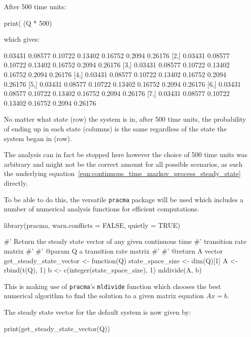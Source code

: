 After 500 time units:

\begin{Rin}
print( (Q * 500) %
\end{Rin}

which gives:

\begin{Rout}
        [,1]    [,2]    [,3]    [,4]    [,5]   [,6]    [,7]
[1,] 0.03431 0.08577 0.10722 0.13402 0.16752 0.2094 0.26176
[2,] 0.03431 0.08577 0.10722 0.13402 0.16752 0.2094 0.26176
[3,] 0.03431 0.08577 0.10722 0.13402 0.16752 0.2094 0.26176
[4,] 0.03431 0.08577 0.10722 0.13402 0.16752 0.2094 0.26176
[5,] 0.03431 0.08577 0.10722 0.13402 0.16752 0.2094 0.26176
[6,] 0.03431 0.08577 0.10722 0.13402 0.16752 0.2094 0.26176
[7,] 0.03431 0.08577 0.10722 0.13402 0.16752 0.2094 0.26176
\end{Rout}

No matter what state (row) the system is in,
after 500 time units, the probability of ending up in each state (columns) is
the same regardless of the state the system began in (row).

The analysis can in fact be stopped here
however the choice of 500 time units was arbitrary and might not be the correct
amount for all possible scenarios, as such the
underlying equation~\ref{eqn:continuous_time_markov_process_steady_state}
directly.

To be able to do this, the versatile \texttt{pracma} package will be used
which includes a number of numerical analysis functions for efficient
computations.

\begin{Rin}
library(pracma, warn.conflicts = FALSE, quietly = TRUE)

#' Return the steady state vector of any given continuous time
#' transition rate matrix
#'
#' @param Q a transition rate matrix
#'
#' @return A vector
get_steady_state_vector <- function(Q){
  state_space_size <- dim(Q)[1]
  A <- rbind(t(Q), 1)
  b <- c(integer(state_space_size), 1)
  mldivide(A, b)
}
\end{Rin}

This is making use of \texttt{pracma}'s \texttt{mldivide} function
which chooses the best numerical algorithm to find the solution to a given
matrix equation \(Ax=b\).

The steady state vector for the default system is now given by:

\begin{Rin}
print(get_steady_state_vector(Q))
\end{Rin}

